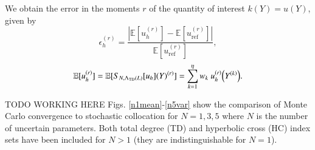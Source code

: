 \documentclass{anstrans} \usepackage{amsmath} \usepackage{amssymb}
\newcommand{\expv}[1]{\ensuremath{\mathbb{E}[ #1]}} \newcommand{\xs}[2]{\ensuremath{\Sigma_{#1}^{(#2)}}}
\begin{document}
We obtain the error in the moments $r$ of the quantity of interest $k(Y)=u(Y)$, given by
\begin{equation}
  \epsilon_h^{(r)}=\frac{|\expv{u_h^{(r)}}-\expv{u_\text{ref}^{(r)}}|}{\expv{u_\text{ref}^{(r)}}},
\end{equation}
\begin{equation}
  \expv{u_h^{(r)}}=\expv{S_{N,\Lambda_\text{TD}(L)}[u_h](Y)^{(r)}}=\sum_{k=1}^\eta w_k
  ~u_h^{(r)}\qty(Y^{(k)}).
\end{equation}

TODO WORKING HERE
Figs. \ref{n1mean}-\ref{n5var} show the comparison of Monte Carlo convergence to stochastic collocation for
$N=1,3,5$ where $N$ is the number of uncertain parameters.  Both total degree (TD) and hyperbolic cross (HC)
index sets have been included for $N>1$ (they are indistinguishable for $N=1$).
\end{document}
